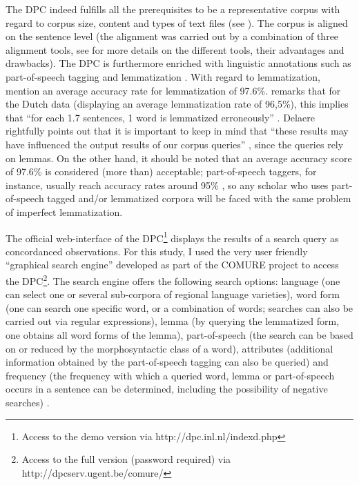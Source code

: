The DPC indeed fulfills all the prerequisites to be a representative corpus with regard to corpus size, content and types of text files (see ). The corpus is aligned on the sentence level (the alignment was carried out by a combination of three alignment tools, see \citealt[190--191]{spyns_dutch_2013} for more details on the different tools, their advantages and drawbacks). The DPC is furthermore enriched with linguistic annotations such as part-of-speech tagging and lemmatization \citep[191]{spyns_dutch_2013}. With regard to lemmatization, \citet[384]{macken_dutch_2011} mention an average accuracy rate for lemmatization of 97.6\%. \citet[50]{delaere_translations_2015} remarks that for the Dutch data (displaying an average lemmatization rate of 96,5\%), this implies that “for each 1.7 sentences, 1 word is lemmatized erroneously” \citep[50]{delaere_translations_2015}. Delaere rightfully points out that it is important to keep in mind that “these results may have influenced the output results of our corpus queries” \citep[50]{delaere_translations_2015}, since the queries rely on lemmas. On the other hand, it should be noted that an average accuracy score of 97.6\% is considered (more than) acceptable; part-of-speech taggers, for instance, usually reach accuracy rates around 95\% \citep[383]{macken_dutch_2011}, so any scholar who uses part-of-speech tagged and/or lemmatized corpora will be faced with the same problem of imperfect lemmatization.

The official web-interface of the DPC\footnote{Access to the demo version via http://dpc.inl.nl/indexd.php} displays the results of a search query as concordanced observations. For this study, I used the very user friendly “graphical search engine” developed as part of the COMURE project to access the DPC\footnote{Access to the full version (password required) via http://dpcserv.ugent.be/comure/}. The search engine offers the following search options: language (one can select one or several sub-corpora of regional language varieties), word form (one can search one specific word, or a combination of words; searches can also be carried out via regular expressions), lemma (by querying the lemmatized form, one obtains all word forms of the lemma), part-of-speech (the search can be based on or reduced by the morphosyntactic class of a word), attributes (additional information obtained by the part-of-speech tagging can also be queried) and frequency (the frequency with which a queried word, lemma or part-of-speech occurs in a sentence can be determined, including the possibility of negative searches) \citep[62--65]{delaere_translations_2015}.

